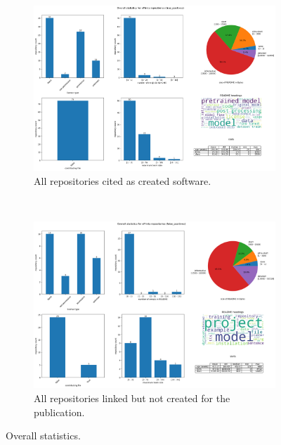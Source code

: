 \documentclass[10pt,a4paper]{scrartcl}
\begin{document}
\begin{figure}[h]
    \centering
    \begin{subfigure}[t]{0.8\textwidth}
        \centering
        \includegraphics[width=\textwidth]{../analysis/overall/overall_true_positives.png}
        \caption{All repositories cited as created software.}
        \label{fig:overall_tp}
    \end{subfigure}\\
    \begin{subfigure}[t]{0.8\textwidth}
        \centering
        \includegraphics[width=\textwidth]{../analysis/overall/overall_false_positives.png}
        \caption{All repositories linked but not created for the publication.}
        \label{fig:overall_fp}
    \end{subfigure}
    \caption{Overall statistics.}
    \label{fig:overall_tfp}
\end{figure}
\end{document}
